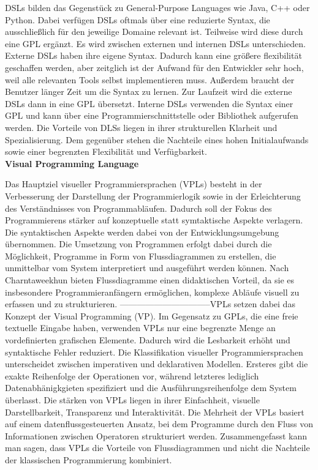 \documentclass{article}
\begin{document}
    DSLs bilden das Gegenstück zu General-Purpose Languages wie Java, C++ oder Python. \cite{14}
    Dabei verfügen DSLs oftmals über eine reduzierte Syntax, die ausschließlich für den jeweilige Domaine relevant ist. Teilweise wird diese durch eine GPL ergänzt. \cite{18}
    Es wird zwischen externen und internen DSLs unterschieden. Externe DSLs haben ihre eigene Syntax. Dadurch kann eine größere flexibilität geschaffen werden, aber zeitglich ist der Aufwand für den Entwickler sehr hoch, weil alle relevanten Tools selbst implementieren muss. Außerdem braucht der Benutzer länger Zeit um die Syntax zu lernen. \cite{7}
    Zur Laufzeit wird die externe DSLs dann in eine GPL übersetzt. \cite{14}
    Interne DSLs verwenden die Syntax einer GPL und kann über eine Programmierschnittstelle oder Bibliothek aufgerufen werden. \cite{14}
    Die Vorteile von DLSs liegen in ihrer strukturellen Klarheit und Spezialisierung. Dem gegenüber stehen die Nachteile eines hohen Initialaufwands sowie einer begrenzten Flexibilität und Verfügbarkeit. \cite{18} \\ 
    \textbf{Visual Programming Language} \par
    Das Hauptziel visueller Programmiersprachen (VPLs) besteht in der Verbesserung der Darstellung der Programmierlogik sowie in der Erleichterung des Verständnisses von Programmabläufen. \cite{13}
    Dadurch soll der Fokus des Programmierens stärker auf konzeptuelle statt symtaktische Aspekte verlagern. Die syntaktischen Aspekte werden dabei von der Entwicklungsumgebung übernommen. \cite{10}
    Die Umsetzung von Programmen erfolgt dabei durch die Möglichkeit, Programme in Form von Flussdiagrammen zu erstellen, die unmittelbar vom System interpretiert und ausgeführt werden können. \cite{12}
    Nach Charntaweekhun bieten Flussdiagramme einen didaktischen Vorteil, da sie es insbesondere Programmieranfängern ermöglichen, komplexe Abläufe visuell zu erfassen und zu strukturieren. \cite{12}
    --------------------------------VPLs setzen dabei das Konzept der Visual Programming (VP). \cite{x} %
    Im Gegensatz zu GPLs, die eine freie textuelle Eingabe haben, verwenden VPLs nur eine begrenzte Menge an vordefinierten grafischen Elemente. Dadurch wird die Lesbarkeit erhöht und syntaktische Fehler reduziert.\cite{10}
    Die Klassifikation visueller Programmiersprachen unterscheidet zwischen imperativen und deklarativen Modellen. Ersteres gibt die exakte Reihenfolge der Operationen vor, während letzteres lediglich Datenabhänigkgieten spezifiziert und die Ausführungsreihenfolge dem System überlasst.\cite{21}
    Die stärken von VPLs liegen in ihrer Einfachheit, visuelle Darstellbarkeit, Transparenz und Interaktivität.\cite{13}
    Die Mehrheit der VPLs basiert auf einem datenflussgesteuerten Ansatz, bei dem Programme durch den Fluss von Informationen zwischen Operatoren strukturiert werden. \cite{6}
    Zusammengefasst kann man sagen, dass VPLs die Vorteile von Flussdiagrammen und nicht die Nachteile der klassischen Programmierung kombiniert. \cite{13}
\end{document}
